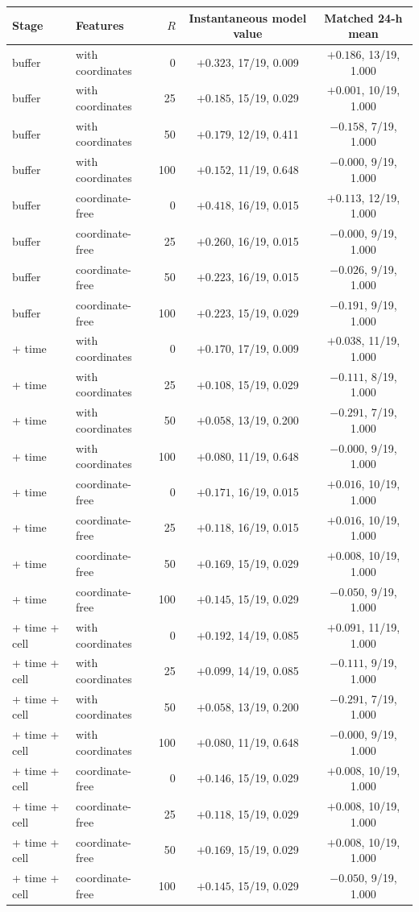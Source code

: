 \begin{tabular}{llrcc}\toprule
Stage & Features & $R$ & Instantaneous model value & Matched 24-h mean \\ \midrule
buffer & with coordinates & 0 & $+0.323$, 17/19, 0.009 & $+0.186$, 13/19, 1.000 \\
buffer & with coordinates & 25 & $+0.185$, 15/19, 0.029 & $+0.001$, 10/19, 1.000 \\
buffer & with coordinates & 50 & $+0.179$, 12/19, 0.411 & $-0.158$, 7/19, 1.000 \\
buffer & with coordinates & 100 & $+0.152$, 11/19, 0.648 & $-0.000$, 9/19, 1.000 \\
buffer & coordinate-free & 0 & $+0.418$, 16/19, 0.015 & $+0.113$, 12/19, 1.000 \\
buffer & coordinate-free & 25 & $+0.260$, 16/19, 0.015 & $-0.000$, 9/19, 1.000 \\
buffer & coordinate-free & 50 & $+0.223$, 16/19, 0.015 & $-0.026$, 9/19, 1.000 \\
buffer & coordinate-free & 100 & $+0.223$, 15/19, 0.029 & $-0.191$, 9/19, 1.000 \\
+ time & with coordinates & 0 & $+0.170$, 17/19, 0.009 & $+0.038$, 11/19, 1.000 \\
+ time & with coordinates & 25 & $+0.108$, 15/19, 0.029 & $-0.111$, 8/19, 1.000 \\
+ time & with coordinates & 50 & $+0.058$, 13/19, 0.200 & $-0.291$, 7/19, 1.000 \\
+ time & with coordinates & 100 & $+0.080$, 11/19, 0.648 & $-0.000$, 9/19, 1.000 \\
+ time & coordinate-free & 0 & $+0.171$, 16/19, 0.015 & $+0.016$, 10/19, 1.000 \\
+ time & coordinate-free & 25 & $+0.118$, 16/19, 0.015 & $+0.016$, 10/19, 1.000 \\
+ time & coordinate-free & 50 & $+0.169$, 15/19, 0.029 & $+0.008$, 10/19, 1.000 \\
+ time & coordinate-free & 100 & $+0.145$, 15/19, 0.029 & $-0.050$, 9/19, 1.000 \\
+ time + cell & with coordinates & 0 & $+0.192$, 14/19, 0.085 & $+0.091$, 11/19, 1.000 \\
+ time + cell & with coordinates & 25 & $+0.099$, 14/19, 0.085 & $-0.111$, 9/19, 1.000 \\
+ time + cell & with coordinates & 50 & $+0.058$, 13/19, 0.200 & $-0.291$, 7/19, 1.000 \\
+ time + cell & with coordinates & 100 & $+0.080$, 11/19, 0.648 & $-0.000$, 9/19, 1.000 \\
+ time + cell & coordinate-free & 0 & $+0.146$, 15/19, 0.029 & $+0.008$, 10/19, 1.000 \\
+ time + cell & coordinate-free & 25 & $+0.118$, 15/19, 0.029 & $+0.008$, 10/19, 1.000 \\
+ time + cell & coordinate-free & 50 & $+0.169$, 15/19, 0.029 & $+0.008$, 10/19, 1.000 \\
+ time + cell & coordinate-free & 100 & $+0.145$, 15/19, 0.029 & $-0.050$, 9/19, 1.000 \\
\bottomrule\end{tabular}
